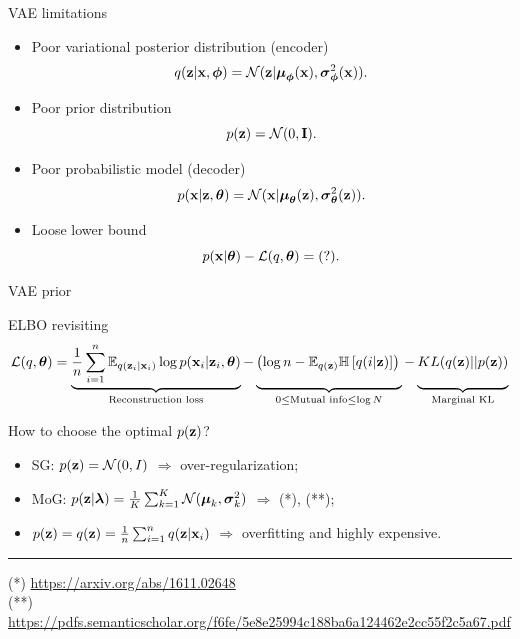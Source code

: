 

\begin{frame}
\titlepage
\end{frame}
\begin{frame}{VAE limitations}
	\begin{itemize}
		\item Poor variational posterior distribution (encoder)
		\[
		q(\mathbf{z} | \mathbf{x}, \boldsymbol{\phi}) = \mathcal{N}(\mathbf{z}| \boldsymbol{\mu}_{\boldsymbol{\phi}}(\mathbf{x}), \boldsymbol{\sigma}^2_{\boldsymbol{\phi}}(\mathbf{x})).
		\]
		\item Poor prior distribution
		\[
		p(\mathbf{z}) = \mathcal{N}(0, \mathbf{I}).
		\]
		\item Poor probabilistic model (decoder)
		\[
		p(\mathbf{x} | \mathbf{z}, \boldsymbol{\theta}) = \mathcal{N}(\mathbf{x}| \boldsymbol{\mu}_{\boldsymbol{\theta}}(\mathbf{z}), \boldsymbol{\sigma}^2_{\boldsymbol{\theta}}(\mathbf{z})).
		\]
		\item Loose lower bound
		\[
		p(\mathbf{x} | \boldsymbol{\theta}) - \mathcal{L}(q, \boldsymbol{\theta}) = (?).
		\]
	\end{itemize}
\end{frame}
\begin{frame}{VAE prior}
	\begin{block}{ELBO revisiting}
		\vspace{-0.3cm}
		{\footnotesize
			\[
			\mathcal{L}(q, \btheta) = \underbrace{\frac{1}{n} \sum_{i=1}^n \mathbb{E}_{q(\bz_i | \bx_i)} \log p(\bx_i | \bz_i, \btheta)}_{\text{Reconstruction loss}} - \underbrace{\left(\log n - \mathbb{E}_{q(\bz)} \mathbb{H} \left[ q(i | \bz) \right] \right)\vphantom{\sum_{i=1}}}_{0 \leq \text{Mutual info} \leq \log N } - \underbrace{KL(q(\bz) || p(\bz))\vphantom{\sum_{i=1}}}_{\text{Marginal KL}}
			\]}
	\end{block}
	
	How to choose the optimal $p(\mathbf{z})$?
	\begin{itemize}
		\item SG: $p(\mathbf{z}) = \mathcal{N}(0, I)$ $\Rightarrow$ over-regularization;
		\vspace{0.1cm}
		\item MoG: $p(\mathbf{z} | \boldsymbol{\lambda}) = \frac{1}{K} \sum_{k=1}^K \mathcal{N}(\boldsymbol{\mu}_k, \boldsymbol{\sigma}_k^2)$ $\Rightarrow$ (*), (**);
		\vspace{0.1cm}
		\item $p(\mathbf{z}) = q(\mathbf{z}) = \frac{1}{n}\sum_{i=1}^n q(\mathbf{z} | \mathbf{x}_i)$ $\Rightarrow$ overfitting and highly expensive.
	\end{itemize}
	\vfill
	\hrule\medskip
	{\tiny 
		(*) \href{https://arxiv.org/abs/1611.02648}{https://arxiv.org/abs/1611.02648} \\
		(**) \href{https://pdfs.semanticscholar.org/f6fe/5e8e25994c188ba6a124462e2cc55f2c5a67.pdf}{https://pdfs.semanticscholar.org/f6fe/5e8e25994c188ba6a124462e2cc55f2c5a67.pdf}}
	
\end{frame}

